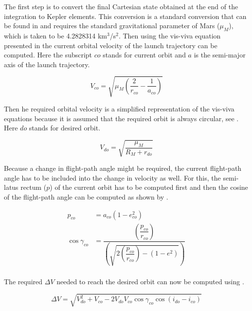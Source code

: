 The first step is to convert the final Cartesian state obtained at the end of the integration to Kepler elements. This conversion is a standard conversion that can be found in \cite{wakker2010} and requires the standard gravitational parameter of Mars ($\mu_{M}$), which is taken to be 4.2828314 km$^{3}$/s$^{2}$. Then using the vis-viva equation presented in  the current orbital velocity of the launch trajectory can be computed. Here the subscript $co$ stands for current orbit and $a$ is the semi-major axis of the launch trajectory.

\begin{equation} \label{eq:visViva}
V_{co} = \sqrt{\mu_{M}\left(\dfrac{2}{r_{co}}-\dfrac{1}{a_{co}}\right)}
\end{equation}


Then he required orbital velocity is a simplified representation of the vis-viva equations because it is assumed that the required orbit is always circular, see . Here $do$ stands for desired orbit.

\begin{equation} \label{eq:simpVisViva}
V_{do}=\sqrt{\dfrac{\mu_{M}}{R_{M}+r_{do}}}
\end{equation} 

Because a change in flight-path angle might be required, the current flight-path angle has to be included into the change in velocity as well. For this, the semi-latus rectum ($p$) of the current orbit has to be computed first and then the cosine of the flight-path angle can be computed as shown by .


\begin{equation}\label{eq:cosFPA}
\begin{split}
p_{co}&=a_{co}\left(1-e_{co}^{2}\right)\\
\cos \gamma_{co}&=\dfrac{\left(\dfrac{p_{co}}{r_{co}}\right)}{\left(\sqrt{2\left(\dfrac{p_{co}}{r_{co}}\right)-\left(1-e^{2}\right)}\right)}\\
\end{split}
\end{equation}

The required $\Delta V$ needed to reach the desired orbit can now be computed using .

\begin{equation} \label{eq:requiredDeltaV}
\Delta V = \sqrt{V_{do}^{2}+V_{co}-2V_{do}V_{co}\cos \gamma_{co}\cos\left(i_{do}-i_{co}\right)}
\end{equation}

